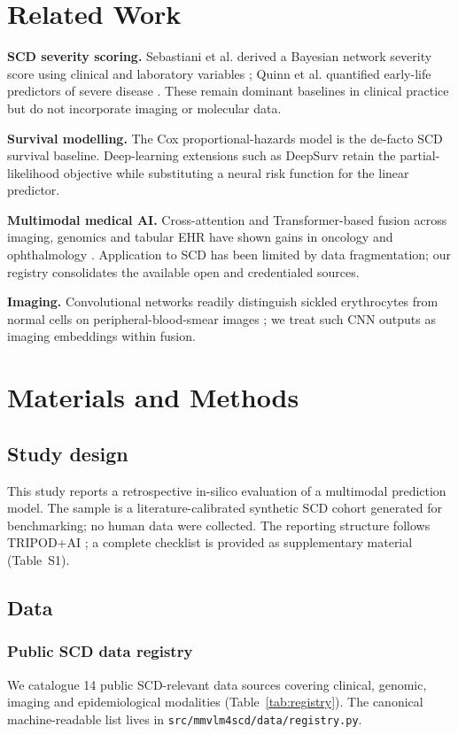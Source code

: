 \documentclass[11pt,a4paper]{article}
\begin{document}
\section{Related Work}
\textbf{SCD severity scoring.} Sebastiani et al. derived a Bayesian network severity score using clinical and laboratory variables \cite{Sebastiani2010}; Quinn et al. quantified early-life predictors of severe disease \cite{Quinn2007}. These remain dominant baselines in clinical practice but do not incorporate imaging or molecular data.

\textbf{Survival modelling.} The Cox proportional-hazards model \cite{Cox1972} is the de-facto SCD survival baseline. Deep-learning extensions such as DeepSurv \cite{Katzman2018} retain the partial-likelihood objective while substituting a neural risk function for the linear predictor.

\textbf{Multimodal medical AI.} Cross-attention and Transformer-based fusion across imaging, genomics and tabular EHR have shown gains in oncology and ophthalmology \cite{Acosta2022,Steyaert2023}. Application to SCD has been limited by data fragmentation; our registry consolidates the available open and credentialed sources.

\textbf{Imaging.} Convolutional networks readily distinguish sickled erythrocytes from normal cells on peripheral-blood-smear images \cite{Xu2017,Alzubaidi2020}; we treat such CNN outputs as imaging embeddings within fusion.
\FloatBarrier
\section{Materials and Methods}
\subsection{Study design}
This study reports a retrospective in-silico evaluation of a multimodal prediction model. The sample is a literature-calibrated synthetic SCD cohort generated for benchmarking; no human data were collected. The reporting structure follows TRIPOD+AI \cite{Collins2024TRIPODAI}; a complete checklist is provided as supplementary material (Table~S1).
\subsection{Data}
\subsubsection{Public SCD data registry}
We catalogue 14 public SCD-relevant data sources covering clinical, genomic, imaging and epidemiological modalities (Table~\ref{tab:registry}). The canonical machine-readable list lives in \texttt{src/mmvlm4scd/data/registry.py}.
\end{document}
